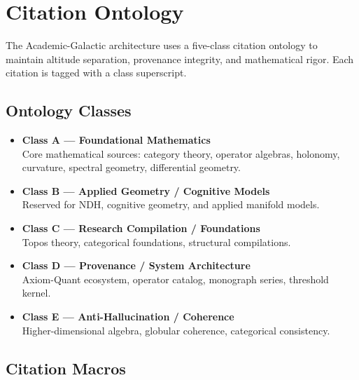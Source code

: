 
\section{Citation Ontology}
\label{sec:CitationOntology}

The Academic-Galactic architecture uses a five-class citation ontology to
maintain altitude separation, provenance integrity, and mathematical rigor.
Each citation is tagged with a class superscript.

\subsection{Ontology Classes}

\begin{itemize}
    \item \textbf{Class A — Foundational Mathematics}\\
    Core mathematical sources: category theory, operator algebras, holonomy,
    curvature, spectral geometry, differential geometry.

    \item \textbf{Class B — Applied Geometry / Cognitive Models}\\
    Reserved for NDH, cognitive geometry, and applied manifold models.

    \item \textbf{Class C — Research Compilation / Foundations}\\
    Topos theory, categorical foundations, structural compilations.

    \item \textbf{Class D — Provenance / System Architecture}\\
    Axiom-Quant ecosystem, operator catalog, monograph series, threshold kernel.

    \item \textbf{Class E — Anti-Hallucination / Coherence}\\
    Higher-dimensional algebra, globular coherence, categorical consistency.
\end{itemize}

\subsection{Citation Macros}

